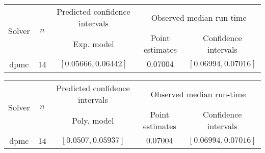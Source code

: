 \begin{tabular}{ccccc}
\hline 
\multirow{2}{*}{Solver} & \multirow{2}{*}{$n$} & Predicted confidence intervals & \multicolumn{2}{c}{Observed median  run-time}\tabularnewline
 &  & Exp. model  & Point estimates  & Confidence intervals\tabularnewline
\hline 
\hline 
\multirow{0}{*}{dpmc} & 14 & $\left[0.05666,0.06442\right]$ & $0.07004$ & $\left[0.06994,0.07016\right]$ \tabularnewline 
\hline 
\end{tabular} 

\begin{tabular}{ccccc}
\hline 
\multirow{2}{*}{Solver} & \multirow{2}{*}{$n$} & Predicted confidence intervals & \multicolumn{2}{c}{Observed median  run-time}\tabularnewline
 &  & Poly. model  & Point estimates  & Confidence intervals\tabularnewline
\hline 
\hline 
\multirow{0}{*}{dpmc} & 14 & $\left[0.0507,0.05937\right]$ & $0.07004$ & $\left[0.06994,0.07016\right]$ \tabularnewline 
\hline 
\end{tabular} 


